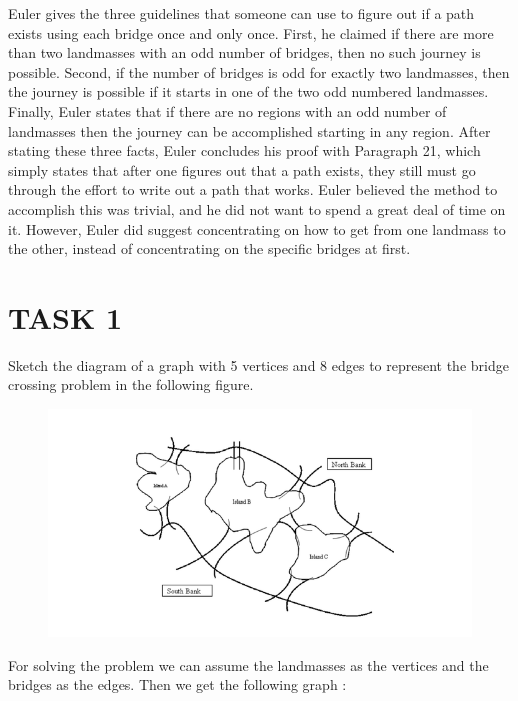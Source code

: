\documentclass[acmsmall]{acmart}
\begin{document}
Euler gives the three guidelines that someone can use to figure out if a path exists using
each bridge once and only once. First, he claimed if there are more than two landmasses
with an odd number of bridges, then no such journey is possible. Second, if the number of
bridges is odd for exactly two landmasses, then the journey is possible if it starts in one of
the two odd numbered landmasses. Finally, Euler states that if there are no regions with
an odd number of landmasses then the journey can be accomplished starting in any
region. After stating these three facts, Euler concludes his proof with Paragraph 21, which
simply states that after one figures out that a path exists, they still must go through the
effort to write out a path that works. Euler believed the method to accomplish this was
trivial, and he did not want to spend a great deal of time on it. However, Euler did suggest
concentrating on how to get from one landmass to the other, instead of concentrating on
the specific bridges at first.\\
\clearpage

\section{TASK 1}

Sketch the diagram of a graph with 5 vertices and 8 edges to represent the bridge crossing
problem in the following figure.\\

\begin{figure}[h]
  \centering
  \includegraphics[width=\linewidth]{rsz_13}
  \caption{}
  \Description{}
\end{figure}

For solving the problem we can assume the landmasses as the vertices and the bridges as
the edges. Then we get the following graph :\\
\end{document}
